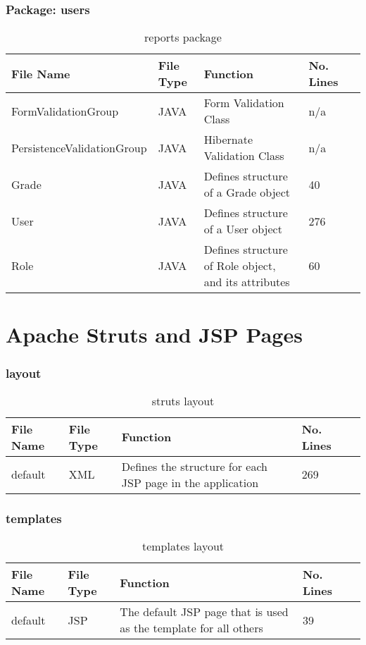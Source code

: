 \subsubsection{Package: users}
\begin{table}[H]
\begin{center}
    \begin{tabular}{| l | l | l| l |p{1cm} |}
    \hline
    File Name & File Type & Function & No. Lines\\ \hline
    FormValidationGroup & JAVA & Form Validation Class & n/a\\ \hline
	PersistenceValidationGroup & JAVA & Hibernate Validation Class & n/a\\ \hline
	Grade & JAVA & Defines structure of a Grade object& 40\\ \hline
	User & JAVA & Defines structure of a User object & 276\\ \hline
	Role & JAVA & Defines structure of Role object, and its attributes & 60\\ \hline	
    \end{tabular}
\end{center}
\caption{reports package}
\end{table}

\section{Apache Struts and JSP Pages}

\subsubsection{layout}
\begin{table}[H]
\begin{center}
   \begin{tabular}{| l | l | l| l |p{1cm} |}
    \hline
    File Name & File Type & Function & No. Lines\\ \hline
	default & XML & Defines the structure for each JSP page in the application & 269\\ \hline	
    \end{tabular}
\end{center}
\caption{struts layout}
\end{table}

\subsubsection{templates}
\begin{table}[H]
\begin{center}
\begin{tabular}{| l | l | l| l |p{1cm} |}
    \hline
    File Name & File Type & Function & No. Lines\\ \hline
	default & JSP & The default JSP page that is used as the template for all others & 39\\ \hline	
    \end{tabular}
\end{center}
\caption{templates layout}
\end{table}

